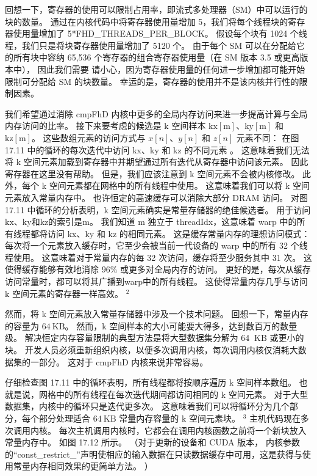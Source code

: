回想一下，寄存器的使用可以限制占用率，即流式多处理器（SM）中可以运行的块的数量。 
通过在内核代码中将寄存器使用量增加 5，我们将每个线程块的寄存器使用量增加了 5*FHD\_THREADS\_PER\_BLOCK。 
假设每个块有 1024 个线程，我们只是将块寄存器使用量增加了 5120 个。
由于每个 SM 可以在分配给它的所有块中容纳 65,536 个寄存器的组合寄存器使用量（在 SM 版本 3.5 或更高版本中），
因此我们需要 请小心，因为寄存器使用量的任何进一步增加都可能开始限制可分配给 SM 的块数量。 
幸运的是，寄存器的使用并不是该内核并行性的限制因素。

我们希望通过消除 cmpFhD 内核中更多的全局内存访问来进一步提高计算与全局内存访问的比率。 
接下来要考虑的候选是 $\mathrm{k}$ 空间样本 $\mathrm{kx}[\mathrm{m}]、\mathrm{ky}[\mathrm{m}]$ 
和 $\mathrm{ kz}[\mathrm{m}]$。 这些数组元素的访问方式与 $x[n]、y[n]$ 和 $z[n]$ 元素不同：
在图 17.11 中的循环的每次迭代中访问 kx、ky 和 kz 的不同元素 。 
这意味着我们无法将 k 空间元素加载到寄存器中并期望通过所有迭代从寄存器中访问该元素。 因此寄存器在这里没有帮助。 
但是，我们应该注意到 k 空间元素不会被内核修改。 此外，每个 k 空间元素都在网格中的所有线程中使用。 
这意味着我们可以将 k 空间元素放入常量内存中。 也许恒定的高速缓存可以消除大部分 DRAM 访问。 
对图 17.11 中循环的分析表明，k 空间元素确实是常量存储器的绝佳候选者。 
用于访问$\mathrm{kx}、\mathrm{ky}$和$\mathrm{kz}$的索引是$\mathrm{m}$。 
我们知道 $\mathrm{m}$ 独立于 threadIdx，这意味着 warp 中的所有线程都将访问 kx、ky 和 kz 的相同元素。 
这是缓存常量内存的理想访问模式：每次将一个元素放入缓存时，它至少会被当前一代设备的 warp 中的所有 32 个线程使用。 
这意味着对于常量内存的每 32 次访问，缓存将至少服务其中 31 次。 这使得缓存能够有效地消除 $96 \%$ 或更多对全局内存的访问。 
更好的是，每次从缓存访问常量时，都可以将其广播到warp中的所有线程。 
这使得常量内存几乎与访问 $\mathrm{k}$ 空间元素的寄存器一样高效。 ${}^{2}$

然而，将 k 空间元素放入常量存储器中涉及一个技术问题。 回想一下，常量内存的容量为 $64 \mathrm{~KB}$。 
然而，k 空间样本的大小可能要大得多，达到数百万的数量级。 
解决恒定内存容量限制的典型方法是将大型数据集分解为 64 $\mathrm{~KB}$ 或更小的块。 
开发人员必须重新组织内核，以便多次调用内核，每次调用内核仅消耗大数据集的一部分。 
这对于 $\mathrm{cmpFhD}$ 内核来说非常容易。

仔细检查图 17.11 中的循环表明，所有线程都将按顺序遍历 k 空间样本数组。 
也就是说，网格中的所有线程在每次迭代期间都访问相同的 k 空间元素。 对于大型数据集，内核中的循环只是迭代更多次。 
这意味着我们可以将循环分为几个部分，每个部分处理适合 $64 \mathrm{~KB}$ 常量内存容量的 k 空间元素块。 
${ }^{3}$ 主机代码现在多次调用内核。 每次主机调用内核时，它都会在调用内核函数之前将一个新块放入常量内存中。 
如图 17.12 所示。 （对于更新的设备和 CUDA 版本，
内核参数的“const\_restrict\_”声明使相应的输入数据在只读数据缓存中可用，这是获得与使用常量内存相同效果的更简单方法。 ）

